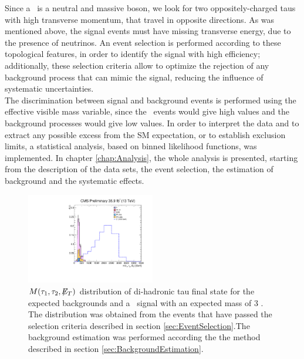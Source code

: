 Since a \Zprime~is a neutral and massive boson, we look for 
two oppositely-charged taus with high transverse momentum, that 
travel in opposite directions. As was mentioned above, the signal events must
have missing transverse energy, due to the presence of neutrinos. An event selection 
is performed according to these topological features, 
in order to identify the signal with high efficiency; additionally, these
selection criteria allow to optimize the rejection of any background 
process that can mimic the signal, reducing the influence of systematic 
uncertainties. \\

\noindent The discrimination between signal and background events is performed
using the effective visible mass variable, since the \Zprimetotauh~events 
would give high values and the background processes would give low values. In order 
to interpret the data and to extract any possible excess from the 
SM expectation, or to establish exclusion limits, a statistical 
analysis, based on binned likelihood functions, was implemented. In 
chapter \ref{chap:Analysis}, the whole analysis is presented, starting from the 
description of the data sets, the event selection, the estimation of background 
and the systematic effects.

\begin{figure}[H]
 \begin{center}
 \captionsetup[subfloat]{farskip=0pt,captionskip=0.0cm,labelformat=empty}
 \includegraphics[clip,width=0.5\textwidth]{figuras/Chapter4/EffVisibleMass_unity.pdf}
\caption{  $M(\tau_1,\tau_2,\not\!\!E_T)$  distribution of di-hadronic tau 
final state for the expected backgrounds and 
a \Zprime~signal with an expected mass of 3 \TeV. The 
distribution was obtained from the events that have passed 
the selection criteria described in section \ref{sec:EventSelection}.The background 
estimation was performed according the the method described in section \ref{sec:BackgroundEstimation}. 
}
\label{eq:Zprime_mass_distribution}
 \end{center}
\end{figure}